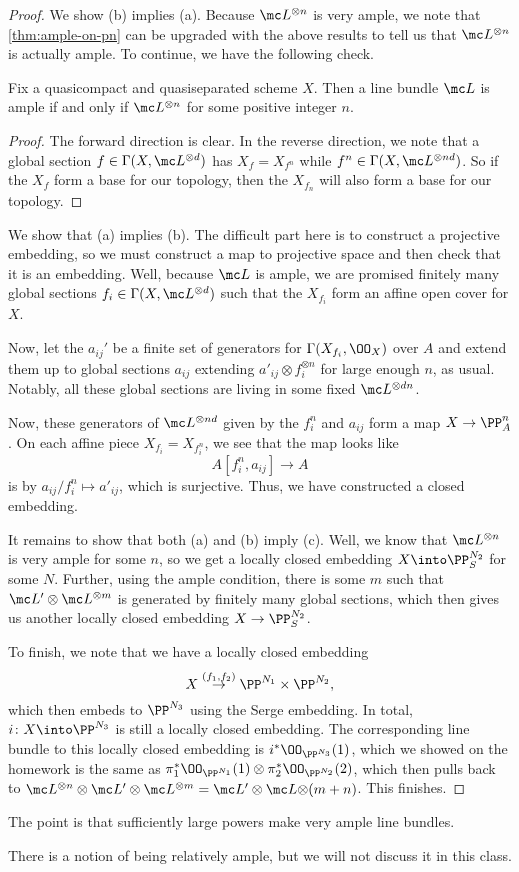 \documentclass[../notes.tex]{subfiles}
\begin{document}
\begin{proof}
	We show (b) implies (a). Because $\mc L^{\otimes n}$ is very ample, we note that \autoref{thm:ample-on-pn} can be upgraded with the above results to tell us that $\mc L^{\otimes n}$ is actually ample. To continue, we have the following check.
	\begin{lemma}
		Fix a quasicompact and quasiseparated scheme $X$. Then a line bundle $\mc L$ is ample if and only if $\mc L^{\otimes n}$ for some positive integer $n$.
	\end{lemma}
	\begin{proof}
		The forward direction is clear. In the reverse direction, we note that a global section $f\in\Gamma(X,\mc L^{\otimes d})$ has $X_f=X_{f^n}$ while $f^n\in\Gamma(X,\mc L^{\otimes nd})$. So if the $X_f$ form a base for our topology, then the $X_{f_n}$ will also form a base for our topology.
	\end{proof}
	We show that (a) implies (b). The difficult part here is to construct a projective embedding, so we must construct a map to projective space and then check that it is an embedding. Well, because $\mc L$ is ample, we are promised finitely many global sections $f_i\in\Gamma(X,\mc L^{\otimes d})$ such that the $X_{f_i}$ form an affine open cover for $X$.

	Now, let the $a_{ij}'$ be a finite set of generators for $\Gamma(X_{f_i},\OO_X)$ over $A$ and extend them up to global sections $a_{ij}$ extending $a'_{ij}\otimes f_i^{\otimes n}$ for large enough $n$, as usual. Notably, all these global sections are living in some fixed $\mc L^{\otimes dn}$.

	Now, these generators of $\mc L^{\otimes nd}$ given by the $f_i^n$ and $a_{ij}$ form a map $X\to\PP^n_A$. On each affine piece $X_{f_i}=X_{f_i^n}$, we see that the map looks like
	\[A[f_i^n,a_{ij}]\to A\]
	is by $a_{ij}/f_i^n\mapsto a'_{ij}$, which is surjective. Thus, we have constructed a closed embedding.

	It remains to show that both (a) and (b) imply (c). Well, we know that $\mc L^{\otimes n}$ is very ample for some $n$, so we get a locally closed embedding $X\into\PP^{N_2}_S$ for some $N$. Further, using the ample condition, there is some $m$ such that $\mc L'\otimes\mc L^{\otimes m}$ is generated by finitely many global sections, which then gives us another locally closed embedding $X\to\PP^{N_2}_S$.

	To finish, we note that we have a locally closed embedding
	\[X\stackrel{(f_1,f_2)}\to\PP^{N_1}\times\PP^{N_2},\]
	which then embeds to $\PP^{N_3}$ using the Serge embedding. In total, $i\colon X\into\PP^{N_3}$ is still a locally closed embedding. The corresponding line bundle to this locally closed embedding is $i^*\OO_{\PP^{N_3}}(1)$, which we showed on the homework is the same as $\pi_1^*\OO_{\PP^{N_1}}(1)\otimes\pi_2^*\OO_{\PP^{N_2}}(2)$, which then pulls back to $\mc L^{\otimes n}\otimes\mc L'\otimes\mc L^{\otimes m}=\mc L'\otimes\mc L{\otimes(m+n)}$. This finishes.
\end{proof}
The point is that sufficiently large powers make very ample line bundles.
\begin{remark}
	There is a notion of being relatively ample, but we will not discuss it in this class.
\end{remark}
\end{document}
